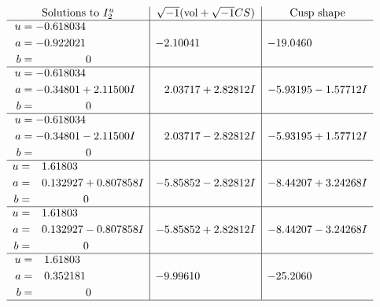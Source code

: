 \documentclass[1p]{elsarticle_modified}
\theoremstyle{definition}
\newcommand{\I}{\sqrt{-1}}
\begin{document}
$$\begin{array}{c|c|c}  
\text{Solutions to }I^u_{2}& \I (\text{vol} + \sqrt{-1}CS) & \text{Cusp shape}\\
 \hline 
\begin{aligned}
u &= -0.618034\phantom{ +0.000000I} \\
a &= -0.922021\phantom{ +0.000000I} \\
b &= \phantom{-0.000000 } 0\end{aligned}
 & -2.10041\phantom{ +0.000000I} & -19.0460\phantom{ +0.000000I} \\ \hline\begin{aligned}
u &= -0.618034\phantom{ +0.000000I} \\
a &= -0.34801 + 2.11500 I \\
b &= \phantom{-0.000000 } 0\end{aligned}
 & \phantom{-}2.03717 + 2.82812 I & -5.93195 - 1.57712 I \\ \hline\begin{aligned}
u &= -0.618034\phantom{ +0.000000I} \\
a &= -0.34801 - 2.11500 I \\
b &= \phantom{-0.000000 } 0\end{aligned}
 & \phantom{-}2.03717 - 2.82812 I & -5.93195 + 1.57712 I \\ \hline\begin{aligned}
u &= \phantom{-}1.61803\phantom{ +0.000000I} \\
a &= \phantom{-}0.132927 + 0.807858 I \\
b &= \phantom{-0.000000 } 0\end{aligned}
 & -5.85852 - 2.82812 I & -8.44207 + 3.24268 I \\ \hline\begin{aligned}
u &= \phantom{-}1.61803\phantom{ +0.000000I} \\
a &= \phantom{-}0.132927 - 0.807858 I \\
b &= \phantom{-0.000000 } 0\end{aligned}
 & -5.85852 + 2.82812 I & -8.44207 - 3.24268 I \\ \hline\begin{aligned}
u &= \phantom{-}1.61803\phantom{ +0.000000I} \\
a &= \phantom{-}0.352181\phantom{ +0.000000I} \\
b &= \phantom{-0.000000 } 0\end{aligned}
 & -9.99610\phantom{ +0.000000I} & -25.2060\phantom{ +0.000000I}\\
 \hline 
 \end{array}$$\newpage\newpage\renewcommand{\arraystretch}{1}
\end{document}
